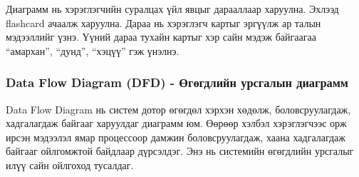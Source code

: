 Диаграмм нь хэрэглэгчийн суралцах үйл явцыг дарааллаар харуулна. Эхлээд flashcard ачаалж харуулна. Дараа нь хэрэглэгч картыг эргүүлж ар талын мэдээллийг үзнэ. Үүний дараа тухайн картыг хэр сайн мэдэж байгаагаа “амархан”, “дунд”, “хэцүү” гэж үнэлнэ.
\subsubsection{Data Flow Diagram (DFD) - Өгөгдлийн урсгалын диаграмм}

Data Flow Diagram нь систем дотор өгөгдөл хэрхэн хөдөлж, боловсруулагдаж, хадгалагдаж байгааг харуулдаг диаграмм юм. Өөрөөр хэлбэл хэрэглэгчээс орж ирсэн мэдээлэл ямар процессоор дамжин боловсруулагдаж, хаана хадгалагдаж байгааг ойлгомжтой байдлаар дүрсэлдэг. Энэ нь системийн өгөгдлийн урсгалыг илүү сайн ойлгоход тусалдаг.

\figDataFlowDiagram

